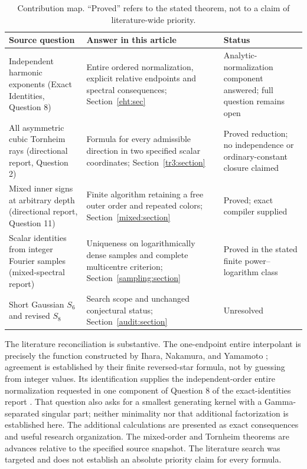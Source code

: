 \documentclass[11pt]{article}
\numberwithin{equation}{section}
\theoremstyle{plain}
\theoremstyle{definition}
\theoremstyle{remark}
\begin{document}
\begin{table}[htbp]
\centering\small
\begin{tabular}{@{}L{0.28\textwidth}L{0.43\textwidth}L{0.22\textwidth}@{}}
\toprule
Source question & Answer in this article & Status \\
\midrule
Independent harmonic exponents (Exact Identities, Question 8)
& Entire ordered normalization, explicit relative endpoints and
  spectral consequences; Section~\ref{eht:sec}
& Analytic-normalization component answered; full question remains open \\
\addlinespace
All asymmetric cubic Tornheim rays (directional report, Question 2)
& Formula for every admissible direction in two specified scalar
  coordinates; Section~\ref{tr3:section}
& Proved reduction; no independence or ordinary-constant closure claimed \\
\addlinespace
Mixed inner signs at arbitrary depth (directional report, Question 11)
& Finite algorithm retaining a free outer order and repeated colors;
  Section~\ref{mixed:section}
& Proved; exact compiler supplied \\
\addlinespace
Scalar identities from integer Fourier samples (mixed-spectral report)
& Uniqueness on logarithmically dense samples and complete multicentre
  criterion; Section~\ref{sampling:section}
& Proved in the stated finite power--logarithm class \\
\addlinespace
Short Gaussian $S_6$ and revised $S_8$
& Search scope and unchanged conjectural status;
  Section~\ref{audit:section}
& Unresolved \\
\bottomrule
\end{tabular}
\caption{Contribution map. ``Proved'' refers to the stated theorem,
not to a claim of literature-wide priority.}\label{scope:map}
\end{table}

The literature reconciliation is substantive. The one-endpoint
entire interpolant is precisely the function constructed by Ihara,
Nakamura, and Yamamoto \cite{eht:INY}; agreement is established by
their finite reversed-star formula, not by guessing from integer
values. Its identification supplies the independent-order entire
normalization requested in one component of Question 8 of the
exact-identities report \cite{RepoExact}. That question also asks for
a smallest generating kernel with a Gamma-separated singular part;
neither minimality nor that additional factorization is established
here. The additional calculations
are presented as exact consequences and useful research organization.
The mixed-order and Tornheim theorems are advances relative to the
specified source snapshot. The literature search was targeted and
does not establish an absolute priority claim for every formula.
\end{document}
